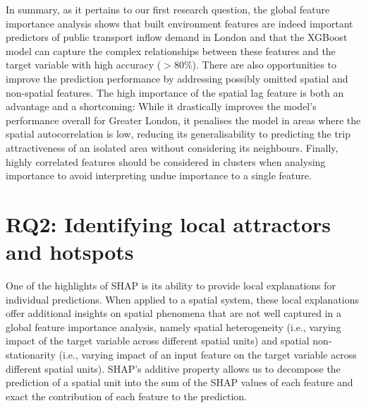 In summary, as it pertains to our first research question, the global feature importance analysis shows that built environment features are indeed important predictors of public transport inflow demand in London and that the XGBoost model can capture the complex relationships between these features and the target variable with high accuracy ($>80\%$). There are also opportunities to improve the prediction performance by addressing possibly omitted spatial and non-spatial features. The high importance of the spatial lag feature is both an advantage and a shortcoming: While it drastically improves the model's performance overall for Greater London, it penalises the model in areas where the spatial autocorrelation is low, reducing its generalisability to predicting the trip attractiveness of an isolated area without considering its neighbours. Finally, highly correlated features should be considered in clusters when analysing importance to avoid interpreting undue importance to a single feature.

\pagebreak[4]
\section{RQ2: Identifying local attractors and hotspots}

One of the highlights of SHAP is its ability to provide local explanations for individual predictions. When applied to a spatial system, these local explanations offer additional insights on spatial phenomena that are not well captured in a global feature importance analysis, namely spatial heterogeneity (i.e., varying impact of the target variable across different spatial units) and spatial non-stationarity (i.e., varying impact of an input feature on the target variable across different spatial units). SHAP's additive property allows us to decompose the prediction of a spatial unit into the sum of the SHAP values of each feature and exact the contribution of each feature to the prediction.


